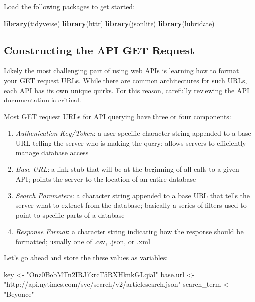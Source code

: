 \documentclass[]{book}
\newenvironment{Shaded}{\begin{snugshade}}{\end{snugshade}}
\newcommand{\KeywordTok}[1]{\textcolor[rgb]{0.13,0.29,0.53}{\textbf{#1}}}
\newcommand{\StringTok}[1]{\textcolor[rgb]{0.31,0.60,0.02}{#1}}
\newcommand{\NormalTok}[1]{#1}
\begin{document}
Load the following packages to get started:

\begin{Shaded}
\begin{Highlighting}[]
\KeywordTok{library}\NormalTok{(tidyverse)}
\KeywordTok{library}\NormalTok{(httr)}
\KeywordTok{library}\NormalTok{(jsonlite)}
\KeywordTok{library}\NormalTok{(lubridate)}
\end{Highlighting}
\end{Shaded}

\subsection{Constructing the API GET
Request}\label{constructing-the-api-get-request}

Likely the most challenging part of using web APIs is learning how to
format your GET request URLs. While there are common architectures for
such URLs, each API has its own unique quirks. For this reason,
carefully reviewing the API documentation is critical.

Most GET request URLs for API querying have three or four components:

\begin{enumerate}
\def\labelenumi{\arabic{enumi}.}
\item
  \emph{Authenication Key/Token}: a user-specific character string
  appended to a base URL telling the server who is making the query;
  allows servers to efficiently manage database access
\item
  \emph{Base URL}: a link stub that will be at the beginning of all
  calls to a given API; points the server to the location of an entire
  database
\item
  \emph{Search Parameters}: a character string appended to a base URL
  that tells the server what to extract from the database; basically a
  series of filters used to point to specific parts of a database
\item
  \emph{Response Format}: a character string indicating how the response
  should be formatted; usually one of .csv, .json, or .xml
\end{enumerate}

Let's go ahead and store the these values as variables:

\begin{Shaded}
\begin{Highlighting}[]
\NormalTok{key <-}\StringTok{ "Onz0BobMTn2IRJ7krcT5RXHknkGLqiaI"}
\NormalTok{base.url <-}\StringTok{ "http://api.nytimes.com/svc/search/v2/articlesearch.json"}
\NormalTok{search_term <-}\StringTok{ "Beyonce"}
\end{Highlighting}
\end{Shaded}
\end{document}
